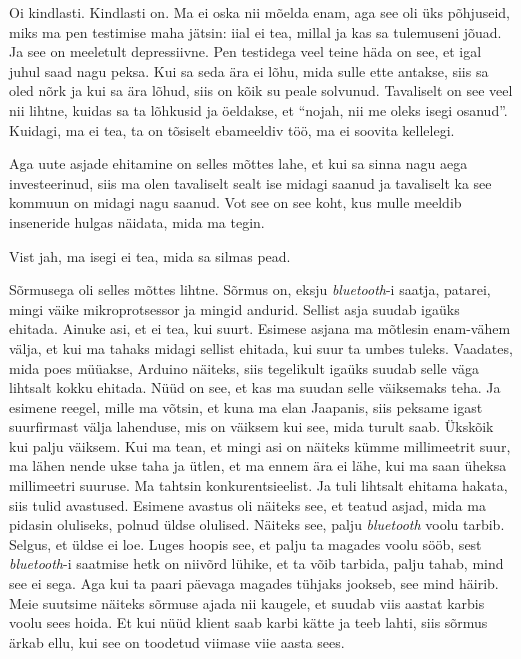 
Oi kindlasti. Kindlasti on. Ma ei oska nii mõelda enam, aga see oli üks 
põhjuseid, miks ma pen testimise maha jätsin: iial ei tea, millal ja kas sa  
tulemuseni jõuad. Ja see on meeletult depressiivne. Pen testidega veel teine 
häda on see, et igal juhul saad nagu peksa. Kui sa seda ära ei lõhu, mida sulle 
ette antakse, siis sa oled nõrk ja kui sa  ära lõhud, siis on kõik su peale 
solvunud. Tavaliselt on see veel nii lihtne, kuidas sa ta  lõhkusid ja 
öeldakse, et \enquote{nojah, nii me oleks isegi osanud}. Kuidagi, ma ei tea, ta 
on tõsiselt ebameeldiv töö, ma ei soovita kellelegi. 

Aga uute asjade ehitamine on selles mõttes lahe, et kui sa sinna nagu aega 
investeerinud, siis ma olen tavaliselt sealt ise midagi saanud ja tavaliselt ka 
see kommuun on midagi nagu saanud. Vot see on see koht, kus mulle meeldib 
inseneride hulgas näidata, mida ma tegin. 


Vist jah, ma isegi ei tea, mida sa silmas pead. 


Sõrmusega oli selles mõttes lihtne. Sõrmus on, eksju \emph{bluetooth}-i saatja, 
patarei, mingi väike mikroprotsessor ja mingid andurid. Sellist asja suudab 
igaüks ehitada. Ainuke asi, et ei tea, kui suurt. Esimese asjana ma mõtlesin 
enam-vähem välja, et kui ma tahaks midagi sellist ehitada, kui suur ta umbes 
tuleks. Vaadates, mida poes müüakse, Arduino näiteks, siis tegelikult igaüks 
suudab selle väga lihtsalt kokku ehitada. Nüüd on see, et kas ma suudan selle 
väiksemaks teha. Ja esimene reegel, mille ma võtsin, et kuna ma elan Jaapanis, 
siis peksame igast suurfirmast välja lahenduse, mis on väiksem kui see, mida 
turult saab. Ükskõik kui palju väiksem. Kui ma tean, et mingi asi on näiteks 
kümme millimeetrit suur, ma lähen nende ukse taha ja ütlen, et ma ennem ära ei 
lähe, kui ma saan üheksa millimeetri suuruse. Ma tahtsin konkurentsieelist. Ja 
tuli lihtsalt ehitama hakata, siis tulid avastused. Esimene avastus oli näiteks 
see, et teatud asjad, mida ma pidasin oluliseks, polnud üldse olulised. Näiteks 
see, palju \emph{bluetooth} voolu tarbib. Selgus, et üldse ei loe. Luges hoopis 
see, et palju ta magades voolu sööb, sest \emph{bluetooth}-i saatmise hetk on 
niivõrd lühike, et ta võib tarbida, palju tahab, mind see ei sega. Aga kui ta 
paari päevaga magades tühjaks jookseb, see mind häirib. Meie suutsime näiteks 
sõrmuse ajada nii kaugele, et suudab viis aastat karbis voolu sees hoida. Et 
kui nüüd klient saab karbi kätte ja teeb lahti, siis sõrmus ärkab ellu,  kui 
see on toodetud viimase viie aasta sees. 

